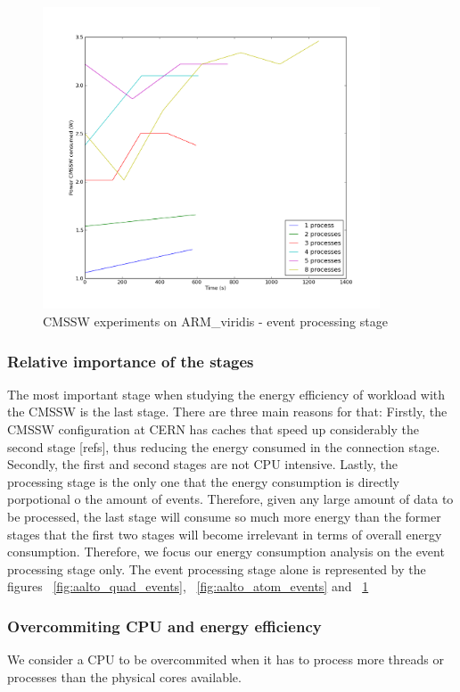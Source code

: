 \begin{figure}[h]
  \centering
    \includegraphics[width=100mm]{"img/aalto/aalto_armEvents"}
    \caption{CMSSW experiments on ARM\_viridis - event processing stage}
    \label{fig:aalto_arm_events}
\end{figure}

\subsubsection*{Relative importance of the stages}
The most important stage when studying the energy efficiency of
workload with the CMSSW is the last stage. There are three main reasons for that: Firstly, the CMSSW configuration at CERN has caches that speed up considerably the second stage [refs], thus reducing the energy consumed in the connection stage.
Secondly, the first and second stages are not CPU intensive.
Lastly, the processing stage is the only one that the energy consumption is directly porpotional o the amount of events. Therefore, given any large amount of
data to be processed, the last stage will consume so much more energy than the former stages that the first two stages will become irrelevant in terms of overall energy consumption. Therefore, we focus our energy consumption analysis on the event processing stage only. The event processing stage alone is represented by the figures ~\ref{fig:aalto_quad_events}, ~\ref{fig:aalto_atom_events} and ~\ref{fig:aalto_arm_events}


\subsubsection*{Overcommiting CPU and energy efficiency}
We consider a CPU to be overcommited when it has to process more threads or processes than the physical cores available.

